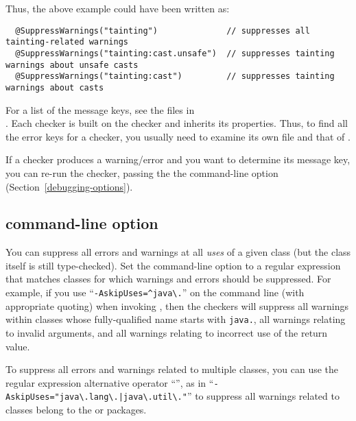 Thus, the above example could have been written as:

\begin{Verbatim}
  @SuppressWarnings("tainting")              // suppresses all tainting-related warnings
  @SuppressWarnings("tainting:cast.unsafe")  // suppresses tainting warnings about unsafe casts
  @SuppressWarnings("tainting:cast")         // suppresses tainting warnings about casts 
\end{Verbatim}

\noindent
For a list of the message keys, 
see the  files in 
\\
.
Each checker is built on the  checker and inherits its
properties.  Thus, to find all the error keys for a checker, you usually
need to examine its own  file and that of
.

If a checker produces a warning/error and you want to determine its message
key, you can re-run the checker, passing the the 
command-line option (Section~\ref{debugging-options}).



\subsection{ command-line option\label{askipuses}}

You can suppress all errors and warnings at all \emph{uses} of a given
class (but the class itself is still type-checked).
Set the  command-line option to a
regular expression that matches classes for which warnings and errors
should be suppressed.  For example, if you use
``{\codesize\verb|-AskipUses=^java\.|}'' on the command line
(with appropriate quoting) when invoking
, then the checkers will suppress all warnings within
classes whose fully-qualified name starts with \codesize\verb|java.|, all
warnings relating to invalid arguments, and all warnings relating to incorrect
use of the return value.

To suppress all errors and warnings related to multiple classes, you can use
the regular expression alternative operator ``\code{|}'', as in
``{\codesize\verb+-AskipUses="java\.lang\.|java\.util\."+}'' to suppress
all warnings related to classes belong to the  or
 packages.


